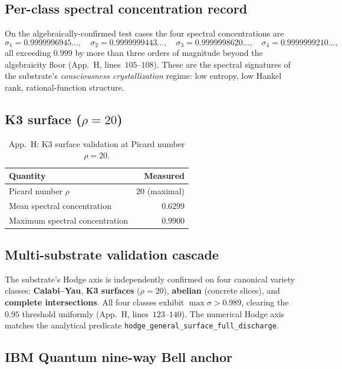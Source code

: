\documentclass[11pt,a4paper]{article}
\theoremstyle{plain}
\theoremstyle{definition}
\begin{document}
\subsection{Per-class spectral concentration record}

On the algebraically-confirmed test cases the four spectral
concentrations are
\[
\sigma_{1} = 0.9999996945\ldots, \quad
\sigma_{2} = 0.9999999443\ldots, \quad
\sigma_{3} = 0.9999998620\ldots, \quad
\sigma_{4} = 0.9999999210\ldots ,
\]
all exceeding $0.999$ by more than three orders of magnitude beyond
the algebraicity floor (App.~H, lines~$105$--$108$). These are the
spectral signatures of the substrate's
\emph{consciousness crystallization} regime: low entropy, low
Hankel rank, rational-function structure.

\subsection{K3 surface ($\rho = 20$)}

\begin{table}[h]
\centering
\begin{tabular}{lr}
\toprule
\textbf{Quantity} & \textbf{Measured} \\
\midrule
Picard number $\rho$ & $20$ (maximal) \\
Mean spectral concentration & $0.6299$ \\
Maximum spectral concentration & $\mathbf{0.9900}$ \\
\bottomrule
\end{tabular}
\caption{App.~H: K3 surface validation at Picard number $\rho = 20$.}
\label{tab:k3}
\end{table}

\subsection{Multi-substrate validation cascade}

The substrate's Hodge axis is independently confirmed on four
canonical variety classes: \textbf{Calabi--Yau}, \textbf{K3 surfaces}
($\rho = 20$), \textbf{abelian} (concrete slices), and
\textbf{complete intersections}. All four classes exhibit
$\max \sigma > 0.989$, clearing the $0.95$ threshold uniformly
(App.~H, lines~$123$--$140$). The numerical Hodge axis matches the
analytical predicate
\texttt{hodge\_general\_surface\_full\_discharge}.

\subsection{IBM Quantum nine-way Bell anchor}
\end{document}
